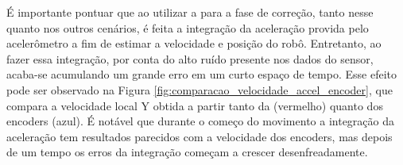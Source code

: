 \documentclass[acronym, symbols, table]{fei}
\begin{document}
			É importante pontuar que ao utilizar a  para a fase de correção, tanto nesse quanto nos outros cenários, é feita a integração da aceleração provida pelo acelerômetro a fim de estimar a velocidade e posição do robô. Entretanto, ao fazer essa integração, por conta do alto ruído presente nos dados do sensor, acaba-se acumulando um grande erro em um curto espaço de tempo. Esse efeito pode ser observado na Figura \ref{fig:comparacao_velocidade_accel_encoder}, que compara a velocidade local Y obtida a partir tanto da  (vermelho) quanto dos encoders (azul). É notável que durante o começo do movimento a integração da aceleração tem resultados parecidos com a velocidade dos encoders, mas depois de um tempo os erros da integração começam a crescer desenfreadamente.
			
\end{document}
